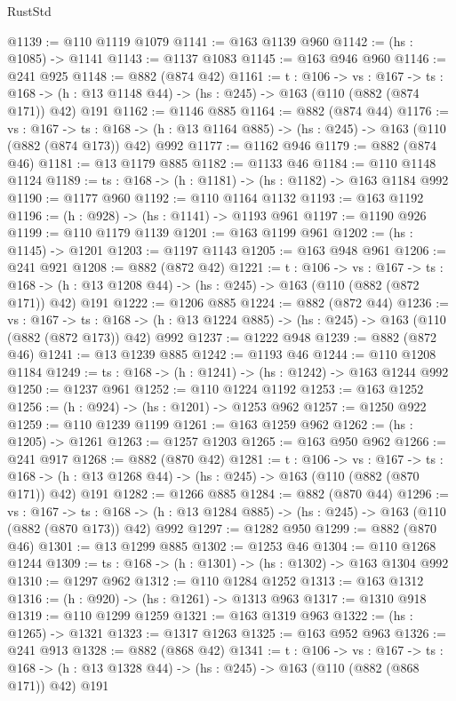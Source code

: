 \begin{lexlean}{RustStd}
\begin{coremodule}
@1139 := @110 @1119 @1079
@1141 := @163 @1139 @960
@1142 := (hs : @1085) -> @1141
@1143 := @1137 @1083
@1145 := @163 @946 @960
@1146 := @241 @925
@1148 := @882 (@874 @42)
@1161 := {t : @106} ->
  {vs : @167} ->
  {ts : @168} -> (h : @13 @1148 @44) -> (hs : @245) -> @163 (@110 (@882 (@874 @171)) @42) @191
@1162 := @1146 @885
@1164 := @882 (@874 @44)
@1176 := {vs : @167} ->
  {ts : @168} -> (h : @13 @1164 @885) -> (hs : @245) -> @163 (@110 (@882 (@874 @173)) @42) @992
@1177 := @1162 @946
@1179 := @882 (@874 @46)
@1181 := @13 @1179 @885
@1182 := @1133 @46
@1184 := @110 @1148 @1124
@1189 := {ts : @168} -> (h : @1181) -> (hs : @1182) -> @163 @1184 @992
@1190 := @1177 @960
@1192 := @110 @1164 @1132
@1193 := @163 @1192
@1196 := (h : @928) -> (hs : @1141) -> @1193 @961
@1197 := @1190 @926
@1199 := @110 @1179 @1139
@1201 := @163 @1199 @961
@1202 := (hs : @1145) -> @1201
@1203 := @1197 @1143
@1205 := @163 @948 @961
@1206 := @241 @921
@1208 := @882 (@872 @42)
@1221 := {t : @106} ->
  {vs : @167} ->
  {ts : @168} -> (h : @13 @1208 @44) -> (hs : @245) -> @163 (@110 (@882 (@872 @171)) @42) @191
@1222 := @1206 @885
@1224 := @882 (@872 @44)
@1236 := {vs : @167} ->
  {ts : @168} -> (h : @13 @1224 @885) -> (hs : @245) -> @163 (@110 (@882 (@872 @173)) @42) @992
@1237 := @1222 @948
@1239 := @882 (@872 @46)
@1241 := @13 @1239 @885
@1242 := @1193 @46
@1244 := @110 @1208 @1184
@1249 := {ts : @168} -> (h : @1241) -> (hs : @1242) -> @163 @1244 @992
@1250 := @1237 @961
@1252 := @110 @1224 @1192
@1253 := @163 @1252
@1256 := (h : @924) -> (hs : @1201) -> @1253 @962
@1257 := @1250 @922
@1259 := @110 @1239 @1199
@1261 := @163 @1259 @962
@1262 := (hs : @1205) -> @1261
@1263 := @1257 @1203
@1265 := @163 @950 @962
@1266 := @241 @917
@1268 := @882 (@870 @42)
@1281 := {t : @106} ->
  {vs : @167} ->
  {ts : @168} -> (h : @13 @1268 @44) -> (hs : @245) -> @163 (@110 (@882 (@870 @171)) @42) @191
@1282 := @1266 @885
@1284 := @882 (@870 @44)
@1296 := {vs : @167} ->
  {ts : @168} -> (h : @13 @1284 @885) -> (hs : @245) -> @163 (@110 (@882 (@870 @173)) @42) @992
@1297 := @1282 @950
@1299 := @882 (@870 @46)
@1301 := @13 @1299 @885
@1302 := @1253 @46
@1304 := @110 @1268 @1244
@1309 := {ts : @168} -> (h : @1301) -> (hs : @1302) -> @163 @1304 @992
@1310 := @1297 @962
@1312 := @110 @1284 @1252
@1313 := @163 @1312
@1316 := (h : @920) -> (hs : @1261) -> @1313 @963
@1317 := @1310 @918
@1319 := @110 @1299 @1259
@1321 := @163 @1319 @963
@1322 := (hs : @1265) -> @1321
@1323 := @1317 @1263
@1325 := @163 @952 @963
@1326 := @241 @913
@1328 := @882 (@868 @42)
@1341 := {t : @106} ->
  {vs : @167} ->
  {ts : @168} -> (h : @13 @1328 @44) -> (hs : @245) -> @163 (@110 (@882 (@868 @171)) @42) @191

\end{coremodule}
\end{lexlean}
